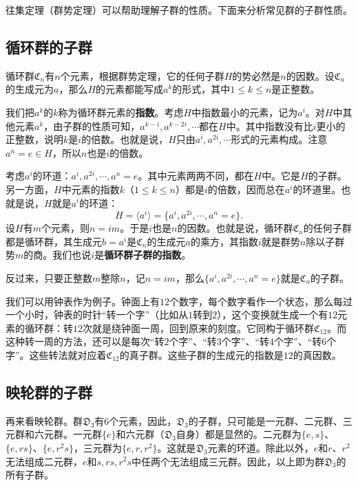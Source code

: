 \documentclass[12pt,UTF8,fontset=none]{ctexbook}
\begin{document}
往集定理（群势定理）可以帮助理解子群的性质。下面来分析常见群的子群性质。

\subsection{循环群的子群}
循环群$\mathfrak{C}_n$有$n$个元素，根据群势定理，它的任何子群$H$的势必然是$n$的因数。设$\mathfrak{C}_n$的生成元为$a$，那么$H$的元素都能写成$a^k$的形式，其中$1\leqslant k \leqslant n$是正整数。

我们把$a^k$的$k$称为循环群元素的\textbf{指数}。考虑$H$中指数最小的元素，记为$a^i$。对$H$中其他元素$a^k$，由子群的性质可知，$a^{k-i}, a^{k-2i}, \cdots$都在$H$中。其中指数没有比$i$更小的正整数，说明$k$是$i$的倍数。也就是说，$H$只由$a^i, a^{2i}, \cdots$形式的元素构成。注意$a^n = e\in H$，所以$n$也是$i$的倍数。

考虑$a^i$的环道：$a^i, a^{2i}, \cdots, a^n = e$。其中元素两两不同，都在$H$中。它是$H$的子群。另一方面，$H$中元素的指数$k$（$1\leqslant k \leqslant n$）都是$i$的倍数，因而总在$a^i$的环道里。也就是说，$H$就是$a^i$的环道：
$$ H = \langle a^i\rangle = \{a^i, a^{2i}, \cdots, a^n=e\}. $$
设$H$有$m$个元素，则$n = im$。于是$i$也是$n$的因数。也就是说，循环群$\mathfrak{C}_n$的任何子群都是循环群，其生成元$b=a^i$是$\mathfrak{C}_n$的生成元$a$的乘方，其指数$i$就是群势$n$除以子群势$m$的商。我们也说$i$是\textbf{循环群子群的指数}。

反过来，只要正整数$m$整除$n$，记$n = im$，那么$\{a^i, a^{2i}, \cdots, a^n=e\}$就是$\mathfrak{C}_n$的子群。

我们可以用钟表作为例子。钟面上有$12$个数字，每个数字看作一个状态，那么每过一个小时，钟表的时针“转一个字”（比如从$1$转到$2$），这个变换就生成一个有$12$元素的循环群：转$12$次就是绕钟面一周，回到原来的刻度。它同构于循环群$\mathfrak{C}_{12}$。而这种转一周的方法，还可以是每次“转$2$个字”、“转$3$个字”、“转$4$个字”、“转$6$个字”。这些转法就对应着$\mathfrak{C}_{12}$的真子群。这些子群的生成元的指数是$12$的真因数。

\subsection{映轮群的子群}
再来看映轮群。群$\mathfrak{D}_3$有$6$个元素，因此，$\mathfrak{D}_3$的子群，只可能是一元群、二元群、三元群和六元群。一元群$\{e\}$和六元群（$\mathfrak{D}_3$自身）都是显然的。二元群为$\{e,s\}$、$\{e,rs\}$、$\{e,r^2s\}$，三元群为$\{e,r,r^2\}$。这就是$\mathfrak{D}_3$元素的环道。除此以外，$e$和$r$、$r^2$无法组成二元群，$e$和$s,rs,r^2s$中任两个无法组成三元群。因此，以上即为群$\mathfrak{D}_3$的所有子群。
\end{document}
